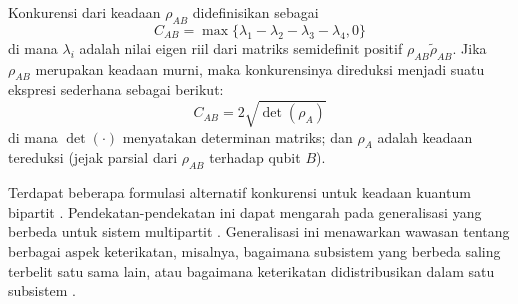 Konkurensi dari keadaan $\rho_{AB}$ didefinisikan sebagai
\begin{equation}
	C_{AB} = \max\{\lambda_1 - \lambda_2 - \lambda_3 - \lambda_4, 0\}
\end{equation}
di mana $\lambda_i$ adalah nilai eigen riil dari matriks semidefinit positif $\rho_{AB}\tilde{\rho}_{AB}$. Jika $\rho_{AB}$ merupakan keadaan murni, maka konkurensinya direduksi menjadi suatu ekspresi sederhana sebagai berikut:
\begin{equation}
	C_{AB} = 2\sqrt{\det(\rho_A)}
\end{equation}
di mana $\det(\cdot)$ menyatakan determinan matriks; dan $\rho_A$ adalah keadaan tereduksi (jejak parsial dari $\rho_{AB}$ terhadap qubit $B$).
\par
Terdapat beberapa formulasi alternatif konkurensi untuk keadaan kuantum bipartit \cite{horodecki2009quantum,Aggarwal2021}. Pendekatan-pendekatan ini dapat mengarah pada generalisasi yang berbeda untuk sistem multipartit \cite{Li2024,Zhu2020}. Generalisasi ini menawarkan wawasan tentang berbagai aspek keterikatan, misalnya,
bagaimana subsistem yang berbeda saling terbelit satu sama lain, atau bagaimana keterikatan didistribusikan dalam satu subsistem \cite{Cornelio2013}.

